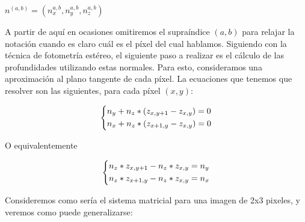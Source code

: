 \begin{center}
$n^{(a,b)} = (n_{x}^{a,b}, n_{y}^{a,b}, n_{z}^{a,b})$
\end{center}

A partir de aquí en ocasiones omitiremos el supraíndice $(a,b)$ para relajar la notación cuando es claro cuál es el píxel del cual hablamos. Siguiendo con la técnica de fotometría estéreo, el siguiente paso a realizar es el cálculo de las profundidades utilizando estas normales. Para esto, consideramos una aproximación al plano tangente de cada píxel. La ecuaciones que tenemos que resolver son las siguientes, para cada píxel $(x ,y)$:

\begin{center}
\[
    \begin{dcases}
        n_{y} +  n_{z} * (z_{x, y+1} - z_{x, y}) = 0 \\
        n_{x} +  n_{z} * (z_{x+1, y} - z_{x, y}) = 0
    \end{dcases}
\]
\end{center}
O equivalentemente
\begin{center}
\[\begin{dcases}
        n_{z} * z_{x, y+1} - n_{z} *  z_{x, y} = n_{y}  \\
        n_{z} * z_{x+1, y} - n_{z} *  z_{x, y} = n_{x}
    \end{dcases}
\]
\end{center}

Consideremos como sería el sistema matricial para una imagen de 2x3 pixeles, y veremos como puede generalizarse: \\


